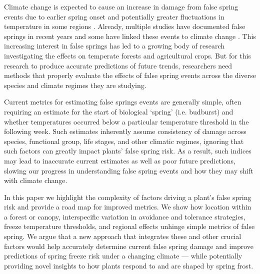 \documentclass{article}\usepackage[]{graphicx}\usepackage[]{color}
\begin{document}
Climate change is expected to cause an increase in damage from false spring events due to earlier spring onset and potentially greater fluctuations in temperature in some regions \citep{Cannell1986, Inouye2008, Martin2010}. Already, multiple studies have documented false springs in recent years \citep{Gu2008, Augspurger2009, Knudson2012, Augspurger2013} and some have linked these events to climate change \citep{Ault2013, Allstadt2015, Muffler2016, Xin2016}. This increasing interest in false springs has led to a growing body of research investigating the effects on temperate forests and agricultural crops. But for this research to produce accurate predictions of future trends, researchers need methods that properly evaluate the effects of false spring events across the diverse species and climate regimes they are studying. 

Current metrics for estimating false springs events are generally simple, often requiring an estimate for the start of biological `spring' (i.e. budburst) and whether temperatures occurred below a particular temperature threshold in the following week. Such estimates inherently assume consistency of damage across species, functional group, life stages, and other climatic regimes, ignoring that such factors can greatly impact plants' false spring risk. As a result, such indices may lead to inaccurate current estimates as well as poor future predictions, slowing our progress in understanding false spring events and how they may shift with climate change. 

In this paper we highlight the complexity of factors driving a plant's false spring risk and provide a road map for improved metrics. We show how location within a forest or canopy, interspecific variation in avoidance and tolerance strategies, freeze temperature thresholds, and regional effects unhinge simple metrics of false spring. We argue that a new approach that integrates these and other crucial factors would help accurately determine current false spring damage and improve predictions of spring freeze risk under a changing climate --- while potentially providing novel insights to how plants respond to and are shaped by spring frost. %
\end{document}

